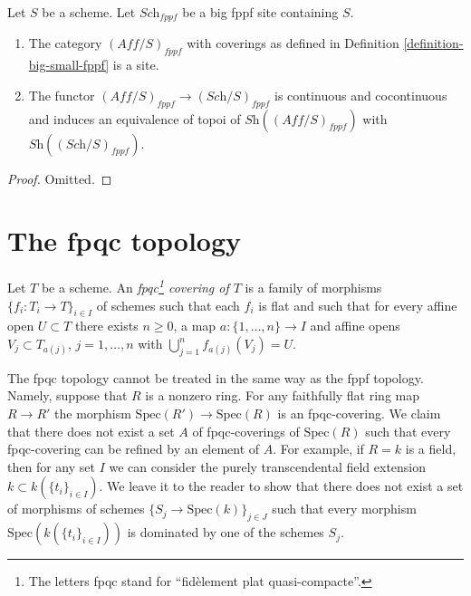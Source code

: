 \begin{lemma}
\label{lemma-verify-site-fppf}
Let $S$ be a scheme. Let $\textit{Sch}_{fppf}$ be a big fppf
site containing $S$.
\begin{enumerate}
\item The category $(\textit{Aff}/S)_{fppf}$ with coverings
as defined in Definition \ref{definition-big-small-fppf} is a site.
\item The functor $(\textit{Aff}/S)_{fppf} \to (\textit{Sch}/S)_{fppf}$
is continuous and cocontinuous and induces an equivalence of topoi
of $\textit{Sh}((\textit{Aff}/S)_{fppf})$ with
$\textit{Sh}((\textit{Sch}/S)_{fppf})$.
\end{enumerate}
\end{lemma}

\begin{proof}
Omitted.
\end{proof}











\section{The fpqc topology}
\label{section-fpqc}

\begin{definition}
\label{definition-fpqc-covering}
Let $T$ be a scheme. An {\it fpqc\footnote{
The letters fpqc stand for ``fid\`element plat quasi-compacte''.}
covering of $T$} is a family
of morphisms $\{f_i : T_i \to T\}_{i \in I}$ of schemes
such that each $f_i$ is flat and such that for every affine open
$U \subset T$ there exists $n \geq 0$, a map
$a : \{1, \ldots, n\} \to I$ and affine opens
$V_j \subset T_{a(j)}$, $j = 1, \ldots, n$
with $\bigcup_{j = 1}^n f_{a(j)}(V_j) = U$.
\end{definition}

\noindent
The fpqc topology cannot be treated in the same way as the fppf topology.
Namely, suppose that $R$ is a nonzero ring. For any faithfully flat
ring map $R \to R'$ the morphism $\text{Spec}(R') \to \text{Spec}(R)$
is an fpqc-covering. We claim that there does not exist a set $A$ of
fpqc-coverings of $\text{Spec}(R)$ such that every fpqc-covering can
be refined by an element of $A$. For example, if $R = k$ is a field,
then for any set $I$ we can consider the purely transcendental field extension
$k \subset k(\{t_i\}_{i \in I})$. We leave it to the reader to show
that there does not exist a set of morphisms of schemes
$\{S_j \to \text{Spec}(k)\}_{j \in J}$ such that every morphism
$\text{Spec}(k(\{t_i\}_{i \in I}))$ is dominated by one of
the schemes $S_j$.

